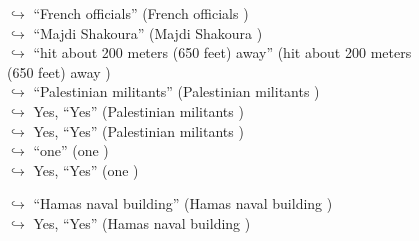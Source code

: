 \documentclass[11pt,a4paper, onecolumn]{article}
\begin{document}
\begin{figure}[t] \small \begin{tcolorbox}[boxsep=0pt,left=5pt,right=0pt,top=2pt,colback = yellow!5] \begin{dialogue}
 \small 
\colorbox{pink!25}{$\hookrightarrow$}
{ ``French officials'' (French officials ) }
\\
\colorbox{pink!25}{$\hookrightarrow$}
{ ``Majdi Shakoura'' (Majdi Shakoura ) }
\\
\colorbox{pink!25}{$\hookrightarrow$}
{ ``hit about 200 meters (650 feet) away'' (hit about 200 meters (650 feet) away ) }
\\
\colorbox{pink!25}{$\hookrightarrow$}
{ ``Palestinian militants'' (Palestinian militants ) }
\\
\colorbox{pink!25}{$\hookrightarrow$}
\colorbox{red!25}{Yes,}
{ ``Yes'' (Palestinian militants ) }
\\
\colorbox{pink!25}{$\hookrightarrow$}
\colorbox{red!25}{Yes,}
{ ``Yes'' (Palestinian militants ) }
\\
\colorbox{pink!25}{$\hookrightarrow$}
{ ``one'' (one ) }
\\
\colorbox{pink!25}{$\hookrightarrow$}
\colorbox{red!25}{Yes,}
{ ``Yes'' (one ) }
 \end{dialogue}\end{tcolorbox}\end{figure}\begin{figure}[t] \small \begin{tcolorbox}[boxsep=0pt,left=5pt,right=0pt,top=2pt,colback = yellow!5] \begin{dialogue}
 \small 
\colorbox{pink!25}{$\hookrightarrow$}
{ ``Hamas naval building'' (Hamas naval building ) }
\\
\colorbox{pink!25}{$\hookrightarrow$}
\colorbox{red!25}{Yes,}
{ ``Yes'' (Hamas naval building ) }
\\
 \end{dialogue}\end{tcolorbox}\end{figure}
\end{document}
